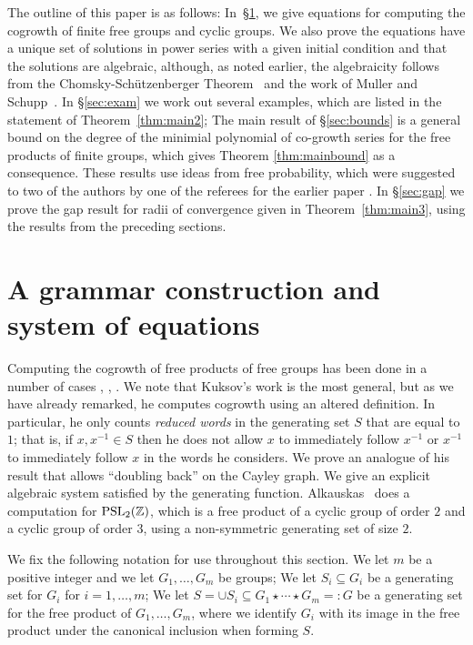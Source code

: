 \documentclass[11pt]{amsart}
\theoremstyle{definition}
\begin{document}
The outline of this paper is as follows: In~\S\ref{sec:grammar}, we
give equations for computing the cogrowth of finite free groups and
cyclic groups.  We also prove the equations have a unique set of
solutions in power series with a given initial condition and that the
solutions are algebraic, although, as noted earlier, the algebraicity
follows from the Chomsky-Sch\"utzenberger Theorem~\cite{chomsky} and
the work of Muller and Schupp~\cite{muller}. In \S\ref{sec:exam} we
work out several examples, which are listed in the statement of
Theorem~\ref{thm:main2}; The main result of \S\ref{sec:bounds} is a
general bound on the degree of the minimial polynomial of co-growth series for
the free products of finite groups, which gives Theorem \ref{thm:mainbound} as a consequence. These results use ideas from free probability, which were suggested to two of the authors by one of the referees for the earlier paper \cite{BeMi20}.  In \S\ref{sec:gap} we prove the gap result for
radii of convergence given in Theorem~\ref{thm:main3}, using the results from the preceding sections. 

\section{A grammar construction and system of equations}
\label{sec:grammar}
Computing the cogrowth of free products of free groups has been done
in a number of cases \cite{alkauskas}, \cite{kuksov}, \cite{kuksov2}.
We note that Kuksov's work is the most general, but as we have already
remarked, he computes cogrowth using an altered definition.  In particular, he only counts \emph{reduced words} in the generating set $S$ that are equal to $1$; that is, if $x, x^{-1}\in S$ then he does not allow $x$ to immediately follow $x^{-1}$ or $x^{-1}$ to immediately follow $x$ in the words he considers.  We prove an analogue of his result that allows ``doubling back'' on the Cayley graph. We give an explicit algebraic system satisfied by the generating function. Alkauskas~\cite{alkauskas} does a computation for ${\rm PSL}_2(\mathbb{Z})$, which is a free product of a cyclic group of order $2$ and a cyclic group of order $3$, using a non-symmetric generating set of size $2$.  

We fix the following notation for use throughout this section.
We let $m$ be a positive integer and we let $G_1,\ldots , G_m$ be groups;
We let $S_i\subseteq G_i$ be a generating set for $G_i$ for $i=1,\ldots ,m$;
We let $S=\cup S_i\subseteq G_1\star \cdots \star G_m =: G$ be a generating set for the free product of $G_1,\ldots ,G_m$, where we identify $G_i$ with its image in the free product under the canonical inclusion when forming $S$.
 
\end{document}
